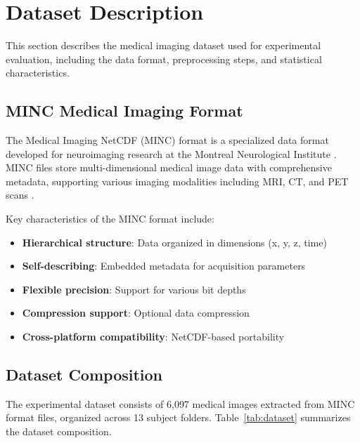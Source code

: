 \documentclass{ipol}
\begin{document}
\section{Dataset Description}\label{sec:dataset}

This section describes the medical imaging dataset used for experimental evaluation, including the data format, preprocessing steps, and statistical characteristics.

\subsection{MINC Medical Imaging Format}

The Medical Imaging NetCDF (MINC) format is a specialized data format developed for neuroimaging research at the Montreal Neurological Institute \cite{bib64}. MINC files store multi-dimensional medical image data with comprehensive metadata, supporting various imaging modalities including MRI, CT, and PET scans \cite{bib60,bib61}.

Key characteristics of the MINC format include:

\begin{itemize}
\item \textbf{Hierarchical structure}: Data organized in dimensions (x, y, z, time)
\item \textbf{Self-describing}: Embedded metadata for acquisition parameters
\item \textbf{Flexible precision}: Support for various bit depths
\item \textbf{Compression support}: Optional data compression
\item \textbf{Cross-platform compatibility}: NetCDF-based portability
\end{itemize}

\subsection{Dataset Composition}

The experimental dataset consists of 6,097 medical images extracted from MINC format files, organized across 13 subject folders. Table~\ref{tab:dataset} summarizes the dataset composition.
\end{document}
